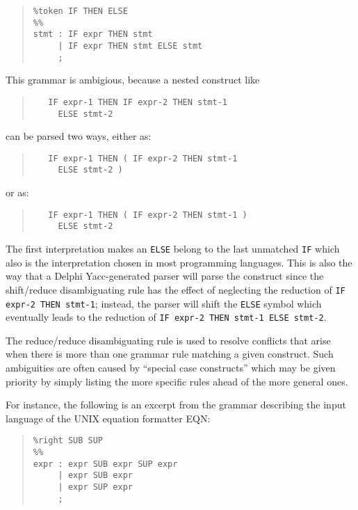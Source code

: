 \documentclass{article}
\begin{document}
\begin{quote}\begin{verbatim}
%token IF THEN ELSE
%%
stmt : IF expr THEN stmt
     | IF expr THEN stmt ELSE stmt
     ;
\end{verbatim}\end{quote}

This grammar is ambigious, because a nested construct like
\begin{quote}\begin{verbatim}
   IF expr-1 THEN IF expr-2 THEN stmt-1
     ELSE stmt-2
\end{verbatim}\end{quote}
can be parsed two ways, either as:
\begin{quote}\begin{verbatim}
   IF expr-1 THEN ( IF expr-2 THEN stmt-1
     ELSE stmt-2 )
\end{verbatim}\end{quote}
or as:
\begin{quote}\begin{verbatim}
   IF expr-1 THEN ( IF expr-2 THEN stmt-1 )
     ELSE stmt-2
\end{verbatim}\end{quote}

The first interpretation makes an \verb"ELSE" belong to the last unmatched
\verb"IF" which also is the interpretation chosen in most programming
languages. This is also the way that a Delphi Yacc-generated parser will parse
the construct since the shift/reduce disambiguating rule has the effect of
neglecting the reduction of \verb"IF expr-2 THEN stmt-1"; instead, the parser
will shift the \verb"ELSE" symbol which eventually leads to the reduction of
\verb"IF expr-2 THEN stmt-1 ELSE stmt-2".

The reduce/reduce disambiguating rule is used to resolve conflicts that
arise when there is more than one grammar rule matching a given construct.
Such ambiguities are often caused by ``special case constructs'' which may be
given priority by simply listing the more specific rules ahead of the more
general ones.

For instance, the following is an excerpt from the grammar describing the
input language of the UNIX equation formatter EQN:

\begin{quote}\begin{verbatim}
%right SUB SUP
%%
expr : expr SUB expr SUP expr
     | expr SUB expr
     | expr SUP expr
     ;
\end{verbatim}\end{quote}
\end{document}
